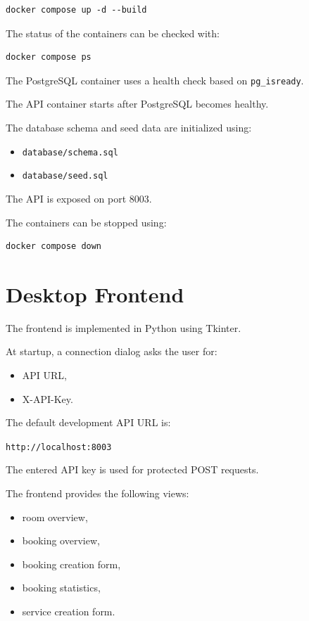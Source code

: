 \documentclass[12pt,a4paper]{article}
\begin{document}
\begin{lstlisting}
docker compose up -d --build
\end{lstlisting}

The status of the containers can be checked with:

\begin{lstlisting}
docker compose ps
\end{lstlisting}

The PostgreSQL container uses a health check based on
\texttt{pg\_isready}.

The API container starts after PostgreSQL becomes healthy.

The database schema and seed data are initialized using:

\begin{itemize}
    \item \texttt{database/schema.sql}
    \item \texttt{database/seed.sql}
\end{itemize}

The API is exposed on port 8003.

The containers can be stopped using:

\begin{lstlisting}
docker compose down
\end{lstlisting}

\section{Desktop Frontend}

The frontend is implemented in Python using Tkinter.

At startup, a connection dialog asks the user for:

\begin{itemize}
    \item API URL,
    \item X-API-Key.
\end{itemize}

The default development API URL is:

\begin{center}
\texttt{http://localhost:8003}
\end{center}

The entered API key is used for protected POST requests.

The frontend provides the following views:

\begin{itemize}
    \item room overview,
    \item booking overview,
    \item booking creation form,
    \item booking statistics,
    \item service creation form.
\end{itemize}
\end{document}
